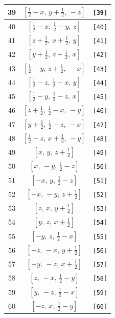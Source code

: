 \documentclass[fleqn,8pt]{jsarticle}
\begin{document}
\begin{longtable}{ccc}
39 & $\left[ \frac{1}{2} - x,\, y + \frac{1}{2},\, - z \right]$ & {\tt [39]} \\ \hline
40 & $\left[ \frac{1}{2} - x,\, \frac{1}{2} - y,\, z \right]$ & {\tt [40]} \\ \hline
41 & $\left[ z + \frac{1}{2},\, x + \frac{1}{2},\, y \right]$ & {\tt [41]} \\ \hline
42 & $\left[ y + \frac{1}{2},\, z + \frac{1}{2},\, x \right]$ & {\tt [42]} \\ \hline
43 & $\left[ \frac{1}{2} - y,\, z + \frac{1}{2},\, - x \right]$ & {\tt [43]} \\ \hline
44 & $\left[ \frac{1}{2} - z,\, \frac{1}{2} - x,\, y \right]$ & {\tt [44]} \\ \hline
45 & $\left[ \frac{1}{2} - y,\, \frac{1}{2} - z,\, x \right]$ & {\tt [45]} \\ \hline
46 & $\left[ z + \frac{1}{2},\, \frac{1}{2} - x,\, - y \right]$ & {\tt [46]} \\ \hline
47 & $\left[ y + \frac{1}{2},\, \frac{1}{2} - z,\, - x \right]$ & {\tt [47]} \\ \hline
48 & $\left[ \frac{1}{2} - z,\, x + \frac{1}{2},\, - y \right]$ & {\tt [48]} \\ \hline
49 & $\left[ x,\, y,\, z + \frac{1}{2} \right]$ & {\tt [49]} \\ \hline
50 & $\left[ x,\, - y,\, \frac{1}{2} - z \right]$ & {\tt [50]} \\ \hline
51 & $\left[ - x,\, y,\, \frac{1}{2} - z \right]$ & {\tt [51]} \\ \hline
52 & $\left[ - x,\, - y,\, z + \frac{1}{2} \right]$ & {\tt [52]} \\ \hline
53 & $\left[ z,\, x,\, y + \frac{1}{2} \right]$ & {\tt [53]} \\ \hline
54 & $\left[ y,\, z,\, x + \frac{1}{2} \right]$ & {\tt [54]} \\ \hline
55 & $\left[ - y,\, z,\, \frac{1}{2} - x \right]$ & {\tt [55]} \\ \hline
56 & $\left[ - z,\, - x,\, y + \frac{1}{2} \right]$ & {\tt [56]} \\ \hline
57 & $\left[ - y,\, - z,\, x + \frac{1}{2} \right]$ & {\tt [57]} \\ \hline
58 & $\left[ z,\, - x,\, \frac{1}{2} - y \right]$ & {\tt [58]} \\ \hline
59 & $\left[ y,\, - z,\, \frac{1}{2} - x \right]$ & {\tt [59]} \\ \hline
60 & $\left[ - z,\, x,\, \frac{1}{2} - y \right]$ & {\tt [60]} \\ \hline

\end{longtable}
\end{document}
